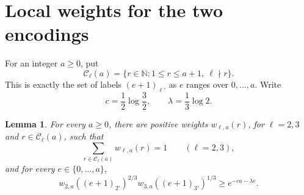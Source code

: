 \documentclass[11pt,a4paper]{article}
\newtheorem{lemma}[theorem]{Lemma}
\theoremstyle{remark}
\newcommand{\NN}{\mathbb N}
\newcommand{\CC}{\mathcal C}
\begin{document}
\section{Local weights for the two encodings}
For an integer $a\ge0$, put
\[
\CC_\ell(a)=\{r\in\NN:1\le r\le a+1,\ \ell\nmid r\}.
\]
This is exactly the set of labels $(e+1)_{\ell'}$ as $e$ ranges over $0,\ldots,a$. Write
\[
c=\frac12\log\frac32,\qquad \lambda=\frac13\log2.
\]

\begin{lemma}\label{lem:weights}
For every $a\ge0$, there are positive weights $w_{\ell,a}(r)$, for $\ell=2,3$ and $r\in\CC_\ell(a)$, such that
\begin{equation}\label{eq:normalized}
\sum_{r\in\CC_\ell(a)}w_{\ell,a}(r)=1\qquad(\ell=2,3),
\end{equation}
and for every $e\in\{0,\ldots,a\}$,
\begin{equation}\label{eq:local}
\boxed{w_{2,a}((e+1)_{2'})^{2/3}
       w_{3,a}((e+1)_{3'})^{1/3}
       \ge e^{-ca-\lambda e}.}
\end{equation}
\end{lemma}
\end{document}
